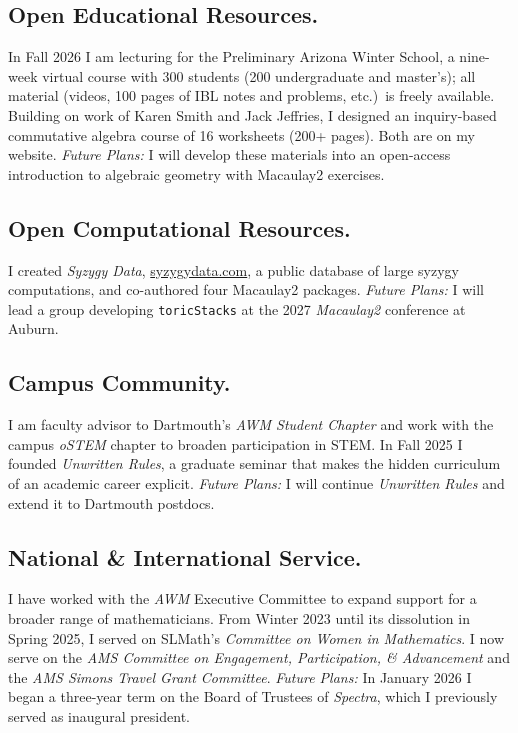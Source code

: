 \documentclass[11pt,reqno]{amsart}
\theoremstyle{remark}
\begin{document}
\subsection{Open Educational Resources.} In Fall 2026 I am lecturing for the Preliminary Arizona Winter School, a nine-week virtual course with 300 students (200 undergraduate and master's); all material (videos, 100 pages of IBL notes and problems, etc.)\ is freely available. Building on work of Karen Smith and Jack Jeffries, I designed an inquiry-based commutative algebra course of 16 worksheets (200+ pages). Both are on my website.  \emph{Future Plans:} I will develop these materials into an open-access introduction to algebraic geometry with Macaulay2 exercises.

\subsection{Open Computational Resources.} I created \textit{Syzygy Data}, \url{syzygydata.com}, a public database of large syzygy computations, and co-authored four Macaulay2 packages. \emph{Future Plans:} I will lead a group developing \texttt{toricStacks} at the 2027 \textit{Macaulay2} conference at Auburn. 

\subsection{Campus Community.} I am faculty advisor to Dartmouth's \textit{AWM Student Chapter} and work with the campus \textit{oSTEM} chapter to broaden participation in STEM. In Fall 2025 I founded \textit{Unwritten Rules}, a graduate seminar that makes the hidden curriculum of an academic career explicit. \emph{Future Plans:} I will continue \textit{Unwritten Rules} and extend it to Dartmouth postdocs.

\subsection{National \& International Service.} I have worked with the \textit{AWM} Executive Committee to expand support for a broader range of mathematicians. From Winter 2023 until its dissolution in Spring 2025, I served on SLMath's \textit{Committee on Women in Mathematics}. I now serve on the \textit{AMS Committee on Engagement, Participation, \& Advancement} and the \textit{AMS Simons Travel Grant Committee}. \emph{Future Plans:} In January 2026 I began a three-year term on the Board of Trustees of \textit{Spectra}, which I previously served as inaugural president.
\end{document}
